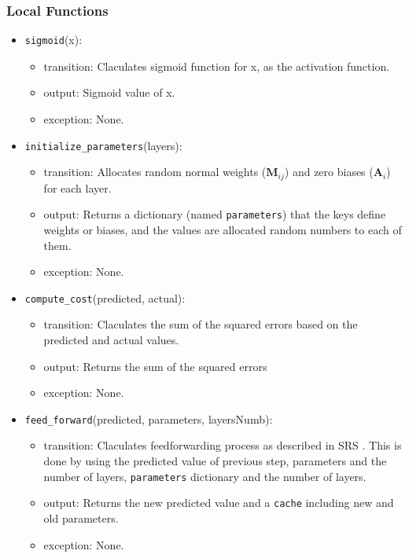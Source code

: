 \documentclass[12pt, titlepage]{article}
\def\code#1{\texttt{#1}}
\begin{document}
\subsubsection{Local Functions}
\begin{itemize}
  \item \code{sigmoid}(x):
  \begin{itemize}
    \item transition: Claculates sigmoid function for x, as the activation function.
    \item output: Sigmoid value of x. 
    \item exception: None.
  \end{itemize}

  \item \code{initialize\_parameters}(layers):
  \begin{itemize}
    \item transition: Allocates random normal weights ($\mathbf{M}_{ij}$) 
    and zero biases ($\mathbf{A}_{i}$) for each layer.
    \item output: Returns a dictionary (named \code{parameters}) 
    that the keys define weights or biases, and the values are allocated random numbers 
    to each of them.
    \item exception: None.
  \end{itemize}

  \item \code{compute\_cost}(predicted, actual):
  \begin{itemize}
    \item transition: Claculates the sum of the squared errors based on the 
    predicted and actual values.
    \item output: Returns the sum of the squared errors
    \item exception: None.
  \end{itemize}

  \item \code{feed\_forward}(predicted, parameters, layersNumb):
  \begin{itemize}
    \item transition: Claculates feedforwarding process as described in SRS \cite{SRS}. 
    This is done by using the predicted value of previous step, parameters and the number of layers, 
    \code{parameters} dictionary and the number of layers.
    \item output: Returns the new predicted value and a \code{cache} including new and old parameters.
    \item exception: None.
  \end{itemize}


\end{itemize}
\end{document}
